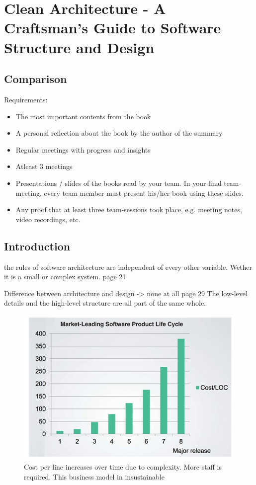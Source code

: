 \documentclass[../Main.tex]{subfiles}
\begin{document}
\chapter{Clean Architecture - A Craftsman's Guide  to Software Structure and Design}


\section{Comparison}


Requirements:
\begin{itemize}
    \item The most important contents from the book
    \item A personal reflection about the book by the author of the summary 
    \item Regular meetings with progress and insights
    \item Atleast 3 meetings
    \item Presentations / slides of the books read by your team. In your final team-meeting, every team
    member must present his/her book using these slides. 
    \item Any proof that at least three team-sessions took place, e.g. meeting notes, video recordings, etc. 
\end{itemize}

\section{Introduction}

the	rules	of	software	architecture	are
independent	of	every	other	variable.
Wether it is a small or complex system. page 21

Difference between architecture and design -> none at all page 29
The	low-level	details	and	the	high-level
structure	are	all	part	of	the	same	whole.	


\begin{figure}[H]
    \centering
    \includegraphics[width=0.75\linewidth]{Images/cpl-over-time.png}
    \caption{Cost per line increases over time due to complexity. More staff is required. This business model in insustainable}
\end{figure}
\end{document}
